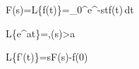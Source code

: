 F(s)=\mathcal L\{f(t)\}=\int_0^\infty e^{-st}f(t)\,dt

\mathcal L\{e^{at}\}=,\qquad \Re(s)>a

\mathcal L\{f'(t)\}=sF(s)-f(0)
